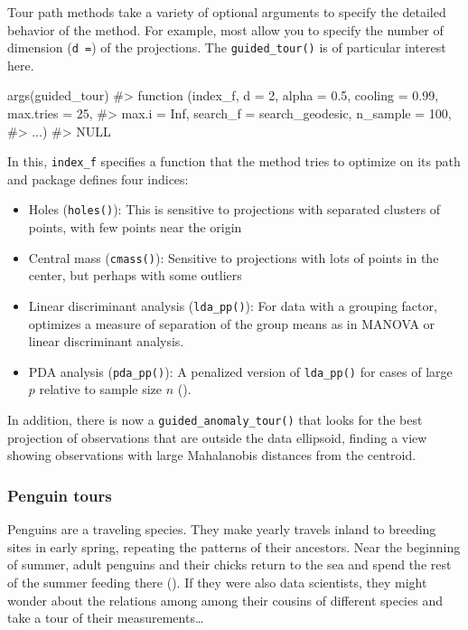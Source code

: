 \documentclass[
  letterpaper,
  10pt,
  krantz2]{krantz}
\makeatletter
\newenvironment{Shaded}{\begin{snugshade}}{\end{snugshade}}
\newcommand{\CommentTok}[1]{\textcolor[rgb]{0.37,0.37,0.37}{#1}}
\newcommand{\FunctionTok}[1]{\textcolor[rgb]{0.28,0.35,0.67}{#1}}
\newcommand{\NormalTok}[1]{\textcolor[rgb]{0.00,0.23,0.31}{#1}}
\providecommand{\tightlist}{%
  \setlength{\itemsep}{0pt}\setlength{\parskip}{0pt}}\usepackage{longtable,booktabs,array}
\newenvironment{kframe}{%
  \medskip{}
  \setlength{\fboxsep}{.8em}
  \def\at@end@of@kframe{}%
  \ifinner\ifhmode%
  \def\at@end@of@kframe{\end{minipage}}%
  \begin{minipage}{\columnwidth}%
  \fi\fi%
  \def\FrameCommand##1{\hskip\@totalleftmargin \hskip-\fboxsep
  \colorbox{shadecolor}{##1}\hskip-\fboxsep
      \hskip-\linewidth \hskip-\@totalleftmargin \hskip\columnwidth}%
  \MakeFramed {\advance\hsize-\width
    \@totalleftmargin\z@ \linewidth\hsize
    \@setminipage}}%
{\par\unskip\endMakeFramed%
  \at@end@of@kframe}
\renewenvironment{Shaded}{\begin{kframe}}{\end{kframe}}
\makeatother
\begin{document}
Tour path methods take a variety of optional arguments to specify the
detailed behavior of the method. For example, most allow you to specify
the number of dimension (\texttt{d\ =}) of the projections. The
\texttt{guided\_tour()} is of particular interest here.

\begin{Shaded}
\begin{Highlighting}[]
\FunctionTok{args}\NormalTok{(guided\_tour)}
\CommentTok{\#\textgreater{} function (index\_f, d = 2, alpha = 0.5, cooling = 0.99, max.tries = 25, }
\CommentTok{\#\textgreater{}     max.i = Inf, search\_f = search\_geodesic, n\_sample = 100, }
\CommentTok{\#\textgreater{}     ...) }
\CommentTok{\#\textgreater{} NULL}
\end{Highlighting}
\end{Shaded}

In this, \texttt{index\_f} specifies a function that the method tries to
optimize on its path and package defines four indices:

\begin{itemize}
\tightlist
\item
  Holes (\texttt{holes()}): This is sensitive to projections with
  separated clusters of points, with few points near the origin
\item
  Central mass (\texttt{cmass()}): Sensitive to projections with lots of
  points in the center, but perhaps with some outliers
\item
  Linear discriminant analysis (\texttt{lda\_pp()}): For data with a
  grouping factor, optimizes a measure of separation of the group means
  as in MANOVA or linear discriminant analysis.
\item
  PDA analysis (\texttt{pda\_pp()}): A penalized version of
  \texttt{lda\_pp()} for cases of large \(p\) relative to sample size
  \(n\) ().
\end{itemize}

In addition, there is now a \texttt{guided\_anomaly\_tour()} that looks
for the best projection of observations that are outside the data
ellipsoid, finding a view showing observations with large Mahalanobis
distances from the centroid.

\subsubsection{Penguin tours}\label{penguin-tours}

Penguins are a traveling species. They make yearly travels inland to
breeding sites in early spring, repeating the patterns of their
ancestors. Near the beginning of summer, adult penguins and their chicks
return to the sea and spend the rest of the summer feeding there
(). If they were also
data scientists, they might wonder about the relations among among their
cousins of different species and take a tour of their
measurements\ldots{}
\end{document}
